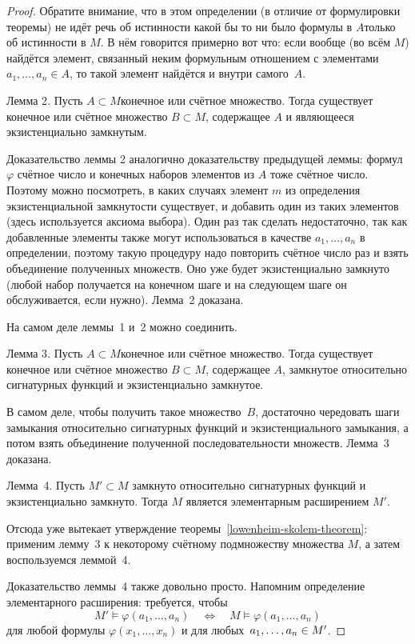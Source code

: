 \begin{proof}
Обратите внимание, что в этом определении (в отличие от
формулировки теоремы) не идёт речь об истинности какой бы то ни
было формулы в $A$\т только об истинности в $M$. В нём говорится
примерно вот что: если вообще (во всём $M$) найдётся элемент,
связанный неким формульным отношением с элементами
$a_1,\dots,a_n\in A$, то такой элемент найдётся и внутри
самого~$A$.

\textsf{Лемма 2}. Пусть $A\subset M$\т конечное или
счётное множество. Тогда существует конечное или счётное
множество $B\subset M$, содержащее $A$ и являющееся экзистенциально
замкнутым.

Доказательство леммы 2 аналогично доказательству предыдущей
леммы: формул $\varphi$ счётное число и конечных наборов
элементов из $A$ тоже счётное число. Поэтому можно посмотреть, в
каких случаях элемент $m$ из определения экзистенциальной
замкнутости существует, и добавить один из таких элементов
(здесь используется аксиома выбора). Один раз так сделать
недостаточно, так как добавленные элементы также могут
использоваться в качестве $a_1,\dots,a_n$ в определении, поэтому
такую процедуру надо повторить счётное число раз и взять
объединение полученных множеств. Оно уже будет экзистенциально
замкнуто (любой набор получается на конечном шаге и на следующем
шаге он обслуживается, если нужно). Лемма~2 доказана.

На самом деле леммы~1 и~2 можно соединить.

\textsf{Лемма 3}. Пусть $A\subset M$\т конечное или
счётное множество. Тогда существует конечное или счётное
множество $B\subset M$, содержащее $A$, замкнутое относительно
сигнатурных функций и экзистенциально замкнутое.

В самом деле, чтобы получить такое множество~$B$, достаточно
чередовать шаги замыкания относительно сигнатурных функций
и экзистенциального замыкания, а потом взять объединение
полученной последовательности множеств. Лемма~3 доказана.

\textsf{Лемма~4}. Пусть $M'\subset M$ замкнуто относительно
сигнатурных функций и экзистенциально замкнуто. Тогда $M$
является элементарным расширением $M'$.

Отсюда уже вытекает утверждение
теоремы~\ref{lowenheim-skolem-theorem}: применим лемму~3 к
некоторому счётному подмножеству множества $M$, а затем
воспользуемся леммой~4.

Доказательство леммы~4 также довольно просто. Напомним
определение элементарного расширения: требуется, чтобы
        $$
M'\vDash \varphi(a_1,\dots,a_n) \quad
\Leftrightarrow \quad
M \vDash \varphi(a_1,\dots,a_n)
        $$
для любой формулы $\varphi(x_1,\dots,x_n)$ и для любых~$a_1,\dots,a_n\hm\in M'$.


\end{proof}
